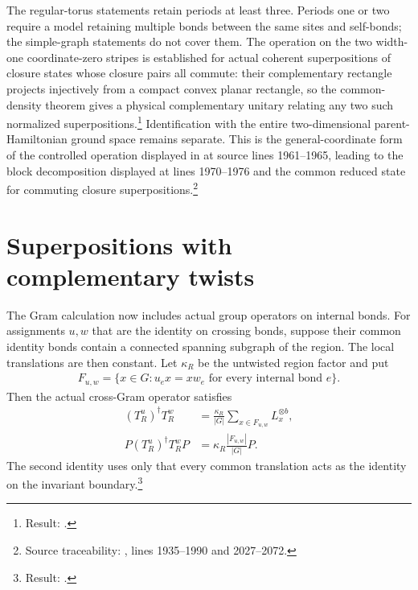 \documentclass{article}
\begin{document}
The regular-torus statements retain periods at least three. Periods one or two
require a model retaining multiple bonds between the same sites and self-bonds;
the simple-graph statements do not cover them. The operation on the two
width-one coordinate-zero stripes is established for actual coherent
superpositions of closure states whose closure pairs all commute: their
complementary rectangle projects injectively from a compact convex planar
rectangle, so the common-density theorem gives a physical complementary
unitary relating any two such normalized superpositions.\footnote{Result:
    .}
Identification
with the entire two-dimensional parent-Hamiltonian ground space remains
separate. This is
the general-coordinate form of the controlled operation displayed in
\cite{Schuch2010PEPS} at source lines 1961--1965, leading to the
block decomposition displayed at lines 1970--1976 and the common reduced
state for commuting closure superpositions.\footnote{Source traceability:
    , lines 1935--1990 and 2027--2072.}

\section{Superpositions with complementary twists}
The Gram calculation now includes actual group operators on internal
bonds. For assignments $u,w$ that are the identity on crossing bonds,
suppose their common identity bonds contain a connected spanning
subgraph of the region. The local translations are then constant.
Let $\kappa_R$ be the untwisted region factor and put
\begin{align}
    F_{u,w}=\{x\in G:u_ex=xw_e\text{ for every internal bond }e\}.
    \label{eq:rmp_peps_qd_intertwiner_set}
\end{align}
Then the actual cross-Gram operator satisfies
\begin{align}
    (T_R^u)^\dagger T_R^w
      &=\frac{\kappa_R}{|G|}\sum_{x\in F_{u,w}}L_x^{\otimes b},
      \label{eq:rmp_peps_qd_cross_gram}\\
    P(T_R^u)^\dagger T_R^wP
      &=\kappa_R\frac{|F_{u,w}|}{|G|}P.
      \label{eq:rmp_peps_qd_projected_cross_gram}
\end{align}
The second identity uses only that every common translation acts as
the identity on the invariant boundary.\footnote{Result:
    .}
\end{document}
